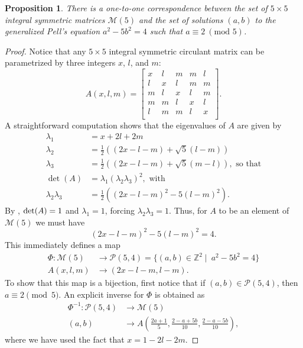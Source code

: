 \documentclass[11pt]{amsart}
\newtheorem{proposition}[theorem]{Proposition}
\newcommand{\Z}{\mathbb{Z}}
\newcommand{\Pell}{\mathcal{P}}
\begin{document}
\begin{proposition}\label{prop: SICUP and Pell's eq}
There is a one-to-one correspondence between the set of $5\times 5$ integral symmetric matrices $\mathcal{M}(5)$ and the set of solutions $(a,b)$ to the generalized Pell's equation $a^{2}-5b^{2}=4$ such that $a\equiv 2~(\text{mod }5)$.
\end{proposition} 
\begin{proof} Notice that any $5\times 5$ integral symmetric circulant matrix can be parametrized by three integers $x$, $l$, and $m$:
\[
\renewcommand{\arraystretch}{1.25}
A(x,l,m) = \left[
\begin{matrix}
	x & l & m & m & l\\
	l & x & l & m & m\\
	m & l & x & l & m\\
	m & m & l & x & l\\
	l & m & m & l & x\\
\end{matrix}
\right].\]
A straightforward computation shows that the eigenvalues of $A$ are given by
\begin{align*}
\lambda_1&=x+2l+2m\\
\lambda_2&=\tfrac{1}{2}\left((2x-l-m)+\sqrt{5}(l-m)\right)\\
\lambda_3&=\tfrac{1}{2}\left((2x-l-m)+\sqrt{5}(m-l)\right),
\text{ so that}\\
\det(A)&=\lambda_1\left(\lambda_2\lambda_3\right)^2, \text{ with}\\
\lambda_2\lambda_3&=\tfrac{1}{2}\left((2x-l-m)^2- 5(l-m)^2\right).
\end{align*}
By , ${\rm det}(A)=1$ and $\lambda_1=1$, forcing $\lambda_2\lambda_3= 1$. Thus, for $A$ to be an element of $\mathcal{M}(5)$ we must have 
\begin{equation*}
(2x-l-m)^2- 5(l-m)^2=4.
\end{equation*}
This immediately defines a map
\begin{align*}
\Phi: \mathcal{M}(5)&\longrightarrow\Pell(5,4)=\{(a,b)\in\Z^2 \mid\ a^{2}-5b^{2}=4\}\\
A(x,l,m)&\longrightarrow(2x-l-m,l-m).
\end{align*}
To show that this map is a bijection, first notice that if $(a,b)\in\Pell(5,4)$, then $a\equiv 2 \pmod{5}$. An explicit inverse for $\Phi$ is obtained as 
\begin{align*}
\Phi^{-1}:\Pell(5,4)&\longrightarrow\mathcal{M}(5)\\
(a,b)&\longrightarrow A\left(\frac{2a+1}{5},\frac{2-a+5b}{10},\frac{2-a-5b}{10}\right),
\end{align*}
where we have used the fact that $x=1-2l-2m$.
\end{proof}
\end{document}
